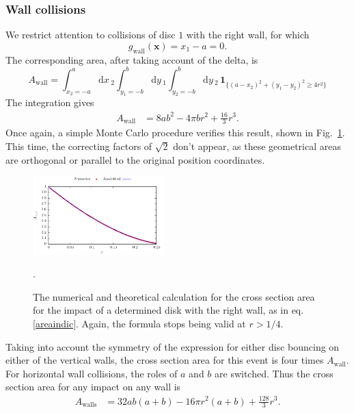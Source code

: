 \documentclass[superscriptaddress,pre,reprint,showpacs,onecolumn]{revtex4-1}
\newcommand{\rd}[1]{\mathrm{d}{#1} \,}
\newcommand{\indicatorsymbol}{\mathbf{1}}
\newcommand{\indicator}[1]{\indicatorsymbol_{ \{   #1 \} } }
\begin{document}
\subsubsection{Wall collisions}

We restrict attention to collisions of disc $1$ with the right wall, for which
$$g_\text{wall}(\mathbf{x}) = x_1 - a = 0.$$
The corresponding area, after taking account of the delta, is
\begin{equation}\label{areaindic}
 A_\mathrm{wall} =  \int_{x_2 = -a}^a \rd x_2 
\int_{y_1 = -b}^b \rd y_1 \int_{y_2 = -b}^b \rd y_2 \, \indicator{ (a-x_2)^2 + (y_1-y_2)^2 \ge 4 r^2 }
\end{equation}
The integration gives
\begin{align}\label{areax1p}
 A_\mathrm{wall} & = 8 a b^2-4  \pi b r^2 +\frac{16}{3}r^3 .
\end{align}
Once again, a simple Monte Carlo procedure verifies this result,
shown in Fig.~\ref{area1derecha}.
This time, the correcting factors of $\sqrt{2}$ don't appear, as
these geometrical areas are orthogonal or parallel to the original
position coordinates.


\begin{figure}
\centering
\includegraphics[width=0.45\textwidth]{./FigurasPerfectas/AreaParedx1Positiva02.pdf}
\caption{The numerical and theoretical calculation for the cross section area
for the impact of a determined disk with the right wall, as in eq. \ref{areaindic}.
Again, the formula stops being valid at $r>1/4$. }
\label{area1derecha}.
\end{figure}

Taking into account the symmetry of the expression for either disc
 bouncing on either of the vertical walls, the
cross section area for this event is four times $A_\textrm{wall}$. For horizontal wall 
collisions, the roles of $a$ and $b$ are switched.
Thus the cross section area for any impact on any wall is
\begin{align}\label{areawalls}
 A_\text{walls} & = 32 a b (a+b)-16 \pi r^2 (a+b) +\frac{128}{3}r^3.
\end{align}
\end{document}
